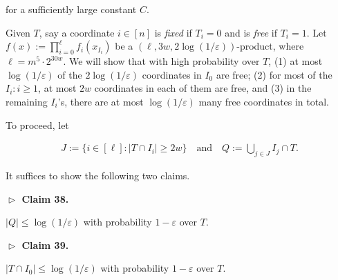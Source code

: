 for a sufficiently large constant $C$.\par




Given $T$, say a coordinate $i\in[n]$ is \emph{fixed} if $T_{i}=0$ and is \emph{free} if $T_{i}=1$.
Let $f(x):=\prod_{i=0}^{\ell}f_{i}(x_{I_{i}})$ be a $(\ell,3w,2\log(1/\varepsilon))$-product, where $\ell=m^{5}\cdot 2^{30w}$.
We will show that with high probability over $T$, (1) at most $\log(1/\varepsilon)$ of the $2\log(1/\varepsilon)$ coordinates in $I_{0}$ are free; (2) for most of the $I_{i}:i\geq 1$, at most $2w$ coordinates in each of them are free, and (3) in the remaining $I_{i}$’s, there are at most $\log(1/\varepsilon)$ many free coordinates in total.\par




To proceed, let\par


\[\begin{gathered}
J:=\{i\in[\ell]:\lvert T\cap I_{i}\rvert\geq 2w\}\quad\text{and}\quad Q:=\bigcup_{j\in J}I_{j}\cap T.
\end{gathered}\]


It suffices to show the following two claims.\par





\par\medskip\noindent\textbf{
$\vartriangleright$ Claim 38. }\par



$\lvert Q\rvert\leq\log(1/\varepsilon)$ with probability $1-\varepsilon$ over $T$.\par







\par\medskip\noindent\textbf{
$\vartriangleright$ Claim 39. }\par



$\lvert T\cap I_{0}\rvert\leq\log(1/\varepsilon)$ with probability $1-\varepsilon$ over $T$.\par






